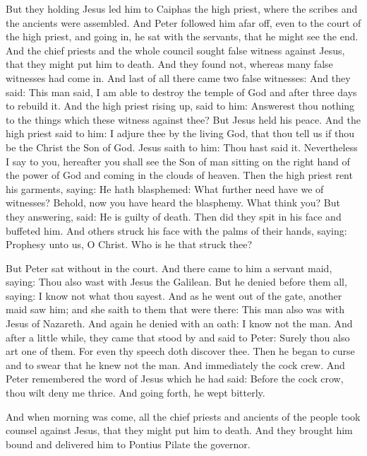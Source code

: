 \begin{multicols}{2}
But they holding Jesus led him to Caiphas the high priest, where the scribes
and the ancients were assembled.  And Peter followed him afar off, even to the
court of the high priest, and going in, he sat with the servants, that he might
see the end.  And the chief priests and the whole council sought false witness
against Jesus, that they might put him to death.  And they found not, whereas
many false witnesses had come in. And last of all there came two false
witnesses: And they said: This man said, I am able to destroy the temple of God
and after three days to rebuild it.  And the high priest rising up, said to
him: Answerest thou nothing to the things which these witness against thee?
But Jesus held his peace. And the high priest said to him: I adjure thee by the
living God, that thou tell us if thou be the Christ the Son of God.  Jesus
saith to him: Thou hast said it. Nevertheless I say to you, hereafter you shall
see the Son of man sitting on the right hand of the power of God and coming in
the clouds of heaven.  Then the high priest rent his garments, saying: He hath
blasphemed: What further need have we of witnesses? Behold, now you have heard
the blasphemy.  What think you? But they answering, said: He is guilty of
death.  Then did they spit in his face and buffeted him. And others struck his
face with the palms of their hands, saying: Prophesy unto us, O Christ. Who is
he that struck thee?  

But Peter sat without in the court. And there came to him a servant maid,
saying: Thou also wast with Jesus the Galilean.  But he denied before them all,
saying: I know not what thou sayest.  And as he went out of the gate, another
maid saw him; and she saith to them that were there: This man also was with
Jesus of Nazareth.  And again he denied with an oath: I know not the man.  And
after a little while, they came that stood by and said to Peter: Surely thou
also art one of them. For even thy speech doth discover thee.  Then he began to
curse and to swear that he knew not the man. And immediately the cock crew.
And Peter remembered the word of Jesus which he had said: Before the cock crow,
thou wilt deny me thrice. And going forth, he wept bitterly.

And when morning was come, all the chief priests and ancients of the people
took counsel against Jesus, that they might put him to death.  And they brought
him bound and delivered him to Pontius Pilate the governor.  


\end{multicols}
